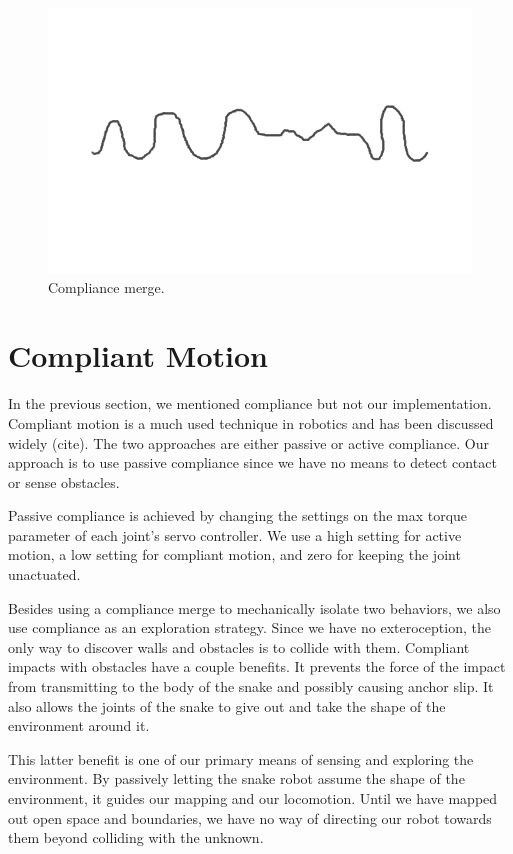 \begin{figure}
\begin{center}
\includegraphics[scale=0.5]{2_behaviors_4.png}
\end{center}
\caption{Compliance merge.}
\label{merging4}
\end{figure}

\section{Compliant Motion}

In the previous section, we mentioned compliance but not our implementation.  Compliant motion is a much used technique in robotics and has been discussed widely (cite).  The two approaches are either passive or active compliance.  Our approach is to use passive compliance since we have no means to detect contact or sense obstacles.

Passive compliance is achieved by changing the settings on the max torque parameter of each joint’s servo controller.  We use a high setting for active motion, a low setting for compliant motion, and zero for keeping the joint unactuated.

Besides using a compliance merge to mechanically isolate two behaviors, we also use compliance as an exploration strategy.  Since we have no exteroception, the only way to discover walls and obstacles is to collide with them.  Compliant impacts with obstacles have a couple benefits.  It prevents the force of the impact from transmitting to the body of the snake and possibly causing anchor slip.   It also allows the joints of the snake to give out and take the shape of the environment around it.  

This latter benefit is one of our primary means of sensing and exploring the environment.  By passively letting the snake robot assume the shape of the environment, it guides our mapping and our locomotion.  Until we have mapped out open space and boundaries, we have no way of directing our robot towards them beyond colliding with the unknown.

